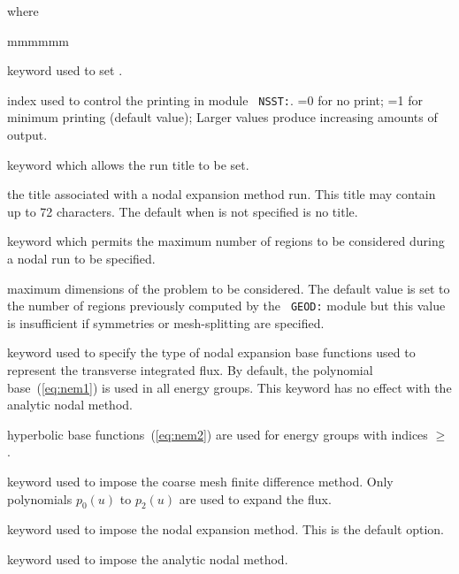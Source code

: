 \noindent where
\begin{ListeDeDescription}{mmmmmm}

\item[\moc{EDIT}] keyword used to set .

\item[\dusa{iprint}] index used to control the printing  in module {\tt
NSST:}. =0 for no print; =1 for minimum printing (default value); Larger
values produce increasing amounts of output.

\item[\moc{TITL}] keyword which allows the run title to be set.

\item[\dusa{TITLE}] the title associated with a nodal expansion method run. This
title may contain up to 72 characters. The default when  is not specified is no title.

\item[\moc{MAXR}] keyword which permits the maximum number of regions to be considered during a nodal run to be specified.

\item[\dusa{maxpts}] maximum dimensions of the problem to be considered.  The
default value is set to the number of regions previously computed by the {\tt
GEOD:} module but this value is insufficient if symmetries or mesh-splitting
are specified.

\item[\moc{HYPE}] keyword used to specify the type of nodal expansion base functions used to represent the transverse integrated flux.
By default, the polynomial base~(\ref{eq:nem1}) is used in all energy groups. This keyword has no effect with the analytic nodal method.

\item[\dusa{igmax}] hyperbolic base functions~(\ref{eq:nem2}) are used for energy groups with indices $\ge$ .

\item[\moc{CMFD}] keyword used to impose the coarse mesh finite difference method. Only polynomials $p_0(u)$ to $p_2(u)$ are used to expand the flux.

\item[\moc{NEM}] keyword used to impose the nodal expansion method. This is the default option.

\item[\moc{ANM}] keyword used to impose the analytic nodal method.

\end{ListeDeDescription}

